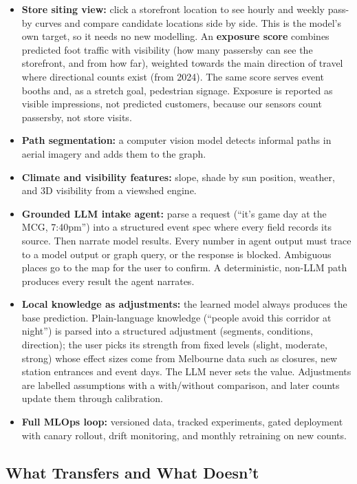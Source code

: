 \documentclass[11pt]{article}
\begin{document}
\begin{itemize}
  \item \textbf{Store siting view:} click a storefront location to see hourly and weekly pass-by curves and compare candidate locations side by side. This is the model's own target, so it needs no new modelling. An \textbf{exposure score} combines predicted foot traffic with visibility (how many passersby can see the storefront, and from how far), weighted towards the main direction of travel where directional counts exist (from 2024). The same score serves event booths and, as a stretch goal, pedestrian signage. Exposure is reported as visible impressions, not predicted customers, because our sensors count passersby, not store visits.
  \item \textbf{Path segmentation:} a computer vision model detects informal paths in aerial imagery and adds them to the graph.
  \item \textbf{Climate and visibility features:} slope, shade by sun position, weather, and 3D visibility from a viewshed engine.
  \item \textbf{Grounded LLM intake agent:} parse a request (``it's game day at the MCG, 7:40pm'') into a structured event spec where every field records its source. Then narrate model results. Every number in agent output must trace to a model output or graph query, or the response is blocked. Ambiguous places go to the map for the user to confirm. A deterministic, non-LLM path produces every result the agent narrates.
  \item \textbf{Local knowledge as adjustments:} the learned model always produces the base prediction. Plain-language knowledge (``people avoid this corridor at night'') is parsed into a structured adjustment (segments, conditions, direction); the user picks its strength from fixed levels (slight, moderate, strong) whose effect sizes come from Melbourne data such as closures, new station entrances and event days. The LLM never sets the value. Adjustments are labelled assumptions with a with/without comparison, and later counts update them through calibration.
  \item \textbf{Full MLOps loop:} versioned data, tracked experiments, gated deployment with canary rollout, drift monitoring, and monthly retraining on new counts.
\end{itemize}

\subsection{What Transfers and What Doesn't}
\label{sec:transfer}
\end{document}
